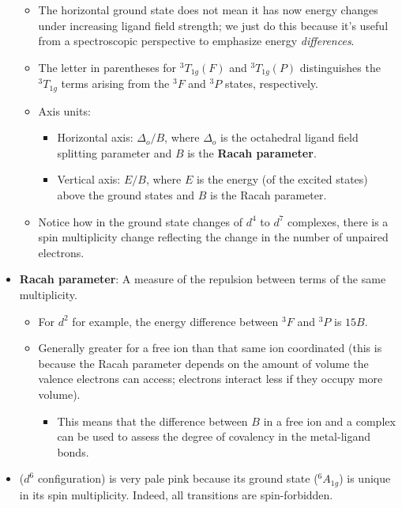 \documentclass[../notes.tex]{subfiles}
\begin{document}
\begin{itemize}
    \begin{itemize}
        \item The horizontal ground state does not mean it has now energy changes under increasing ligand field strength; we just do this because it's useful from a spectroscopic perspective to emphasize energy \emph{differences}.
        \item The letter in parentheses for ${}^3T_{1g}(F)$ and ${}^3T_{1g}(P)$ distinguishes the ${}^3T_{1g}$ terms arising from the ${}^3F$ and ${}^3P$ states, respectively.
        \item Axis units:
        \begin{itemize}
            \item Horizontal axis: $\Delta_o/B$, where $\Delta_o$ is the octahedral ligand field splitting parameter and $B$ is the \textbf{Racah parameter}.
            \item Vertical axis: $E/B$, where $E$ is the energy (of the excited states) above the ground states and $B$ is the Racah parameter.
        \end{itemize}
        \item Notice how in the ground state changes of $d^4$ to $d^7$ complexes, there is a spin multiplicity change reflecting the change in the number of unpaired electrons.
    \end{itemize}
    \item \textbf{Racah parameter}: A measure of the repulsion between terms of the same multiplicity.
    \begin{itemize}
        \item For $d^2$ for example, the energy difference between ${}^3F$ and ${}^3P$ is $15B$.
        \item Generally greater for a free ion than that same ion coordinated (this is because the Racah parameter depends on the amount of volume the valence electrons can access; electrons interact less if they occupy more volume).
        \begin{itemize}
            \item This means that the difference between $B$ in a free ion and a complex can be used to assess the degree of covalency in the metal-ligand bonds.
        \end{itemize}
    \end{itemize}
    \item {} ($d^6$ configuration) is very pale pink because its ground state (${}^6A_{1g}$) is unique in its spin multiplicity. Indeed, all transitions are spin-forbidden.

\end{itemize}
\end{document}
